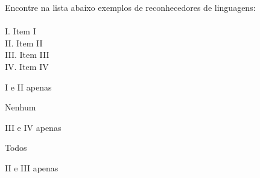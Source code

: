 \question[10]
Encontre na lista abaixo exemplos de reconhecedores de linguagens:\\
\\
I. Item I\\
II. Item II\\
III. Item III\\
IV. Item IV
\\
\begin{choices}
\item I e II apenas
\item Nenhum %
\item III e IV apenas
\item Todos
\item II e III apenas
\end{choices}
\answerline

